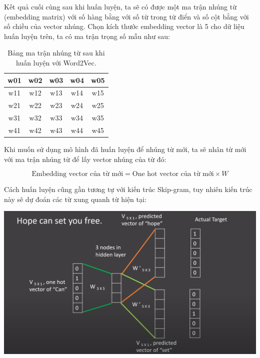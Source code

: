\documentclass[a4paper, 12pt, openany]{book}
\begin{document}
Kết quả cuối cùng sau khi huấn luyện, ta sẽ có được  một ma trận nhúng từ (embedding matrix) với số hàng bằng với số từ trong từ điển và số cột bằng với số chiều của vector nhúng.
Chọn kích thước embedding vector là 5 cho dữ liệu huấn luyện trên, ta có ma trận trọng số mẫu như sau:

\begin{table}[H]
    \centering
    \begin{tabular}{|c|c|c|c|c|}
        \hline
        w01 & w02 & w03 & w04 & w05 \\ \hline
        w11 & w12 & w13 & w14 & w15 \\ \hline
        w21 & w22 & w23 & w24 & w25 \\ \hline
        w31 & w32 & w33 & w34 & w35 \\ \hline
        w41 & w42 & w43 & w44 & w45 \\ \hline
    \end{tabular}
    \caption{Bảng ma trận nhúng từ sau khi huấn luyện với Word2Vec.}
\end{table}

Khi muốn sử dụng mô hình đã huấn luyện để nhúng từ mới, ta sẽ nhân từ mới với ma trận nhúng từ để lấy vector nhúng của từ đó:

\begin{equation}
    \text{Embedding vector của từ mới} = \text{One hot vector của từ mới} \times W
\end{equation}

Cách huấn luyện cũng gần tương tự với kiến trúc Skip-gram, tuy nhiên kiến trúc này sẽ dự đoán các từ xung quanh từ hiện tại:

\vspace{0.5cm}
\begin{minipage}{\linewidth}
    \captionsetup{type=figure}
    \centering
    \includegraphics[width=\linewidth]{./assets/images/skipgram.png}
    \caption{Huấn luyện mô hình Word2Vec với kiến trúc Skip-gram.}
\end{minipage}
\vspace{0.5cm}
\end{document}

